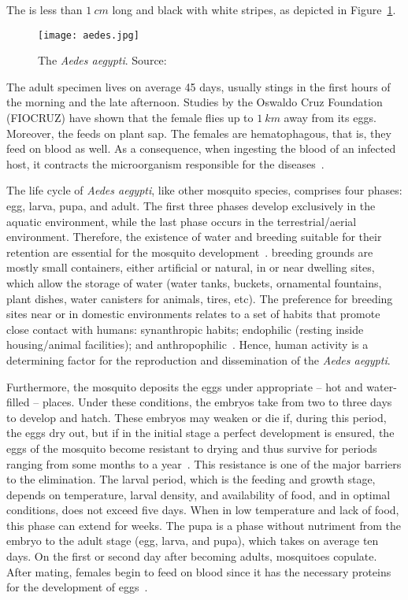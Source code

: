 The \Aedes is less than $1~cm$ long and black with white stripes,
as depicted in Figure~\ref{fig:aedes}.
%
%
\begin{figure}[b]
	\centering
	\texttt{[image: aedes.jpg]}
	\caption[The {\it Aedes aegypti}]{The {\it Aedes aegypti}. Source:~\cite{web:aedesfiocruz}}
	\label{fig:aedes}
\end{figure}
%
The adult specimen lives on average 45 days, usually stings in the first hours of the morning and the late afternoon.
Studies by the Oswaldo Cruz Foundation (FIOCRUZ)
have shown that the female flies up to $1~km$ away from its eggs.
Moreover, the \Aedes feeds on plant sap.
The females are hematophagous, that is, they feed on blood as well.
As a consequence, when ingesting the blood of an infected host, it contracts the microorganism responsible for the diseases~\cite{lambrechts2012vector}.

The life cycle of {\it Aedes aegypti}, like other mosquito species, comprises four phases: egg, larva, pupa, and adult.
The first three phases develop exclusively in the aquatic environment, while the last phase occurs in the terrestrial/aerial environment.
Therefore, the existence of water and breeding suitable for their retention are essential for the mosquito development~\cite{Jansen2010}.
\Aedes breeding grounds are mostly small containers, either artificial or natural, in or near dwelling sites, which allow the storage of water (water tanks, buckets, ornamental fountains, plant dishes, water canisters for animals, tires, etc).
The preference for breeding sites near or in domestic environments relates to a set of habits that promote close contact with humans: synanthropic habits; endophilic (resting inside housing/animal facilities); and anthropophilic~\cite{Jansen2010}.
Hence, human activity is a determining factor for the reproduction and dissemination of the \textit{Aedes aegypti}.

Furthermore, the mosquito deposits the eggs under appropriate -- hot and water-filled -- places.
Under these conditions, the embryos take from two to three days to develop and hatch.
These embryos may weaken or die if, during this period, the eggs dry out, but if in the initial stage a perfect development is ensured, the eggs of the mosquito become resistant to drying and thus survive for periods ranging from some months to a year~\cite{lambrechts2012vector}.
This resistance is one of the major barriers to the \Aedes elimination.
The larval period, which is the feeding and growth stage, depends on temperature, larval density, and availability of food, and in optimal conditions, does not exceed five days.
When in low temperature and lack of food, this phase can extend for weeks. %
The pupa is a phase without nutriment
from the embryo to the adult stage (egg, larva, and pupa), which takes on average ten days.
On the first or second day after becoming adults, mosquitoes copulate.
After mating, females begin to feed on blood since it has the necessary proteins for the development of eggs~\cite{lambrechts2012vector}.


